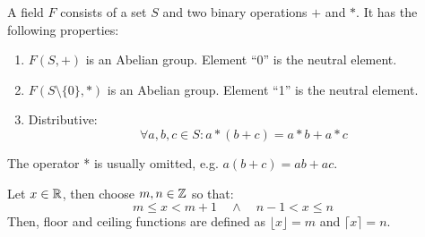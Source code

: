 \begin{definition}[Field]
    A field $F$ consists of a set $S$ and two binary operations $+$ and $*$.
    It has the following properties:
    \begin{enumerate}
        \item $F(S,+)$ is an Abelian group. Element ``0'' is the neutral element.
        \item $F(S\setminus\{0\},*)$ is an Abelian group. Element ``1'' is the neutral element.
        \item Distributive:
            \begin{equation}
                \forall a,b,c \in S: a * (b + c) = a * b + a * c
            \end{equation}
    \end{enumerate}
    The operator * is usually omitted, e.g. $a (b + c) = ab + ac$.
\end{definition}

\begin{definition}
    Let $x \in \mathbb{R}$, then choose $m,n \in \mathbb{Z}$ so that:
    \begin{equation}
        m \le x < m + 1 \quad \land \quad n - 1 < x \le n
    \end{equation}
    Then, floor and ceiling functions are defined as 
    $\lfloor x \rfloor = m$ and 
    $\lceil x \rceil = n$.
\end{definition}

